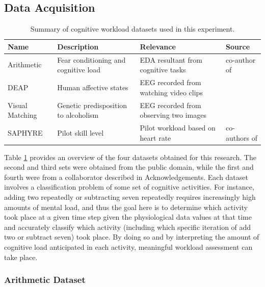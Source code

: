 \documentclass[12pt]{uthesis-v12}  %
\begin{document}
\subsection{Data Acquisition}

\begin{table}[!t]
\caption{Summary of cognitive workload datasets used in this experiment.}
\renewcommand{\arraystretch}{1.3}
\centering
\resizebox{\textwidth}{!}
{\begin{tabular}{*{4}{l}}
\toprule
Name & Description & Relevance & Source \\ \midrule
Arithmetic & Fear conditioning and cognitive load & EDA resultant from cognitive tasks & co-author of \cite{natarajan} \\
DEAP & Human affective states & EEG recorded from watching video clips & \cite{deap} \\
Visual Matching & Genetic predisposition to alcoholism
 & EEG recorded from observing two images & \cite{uci} \\
SAPHYRE & Pilot skill level & Pilot workload based on heart rate & co-authors of \cite{nittala} \\ \bottomrule
\end{tabular}}

\label{data1}
\end{table}

Table \ref{data1} provides an overview of the four datasets obtained for this research. The second and third sets were obtained from the public domain, while the first and fourth were from a collaborator described in Acknowledgements. Each dataset involves a classification problem of some set of cognitive activities. For instance, adding two repeatedly or subtracting seven repeatedly requires increasingly high amounts of mental load, and thus the goal here is to determine which activity took place at a given time step given the physiological data values at that time and accurately classify which activity (including which specific iteration of add two or subtract seven) took place. By doing so and by interpreting the amount of cognitive load anticipated in each activity, meaningful workload assessment can take place.

\subsubsection{Arithmetic Dataset}
\end{document}
